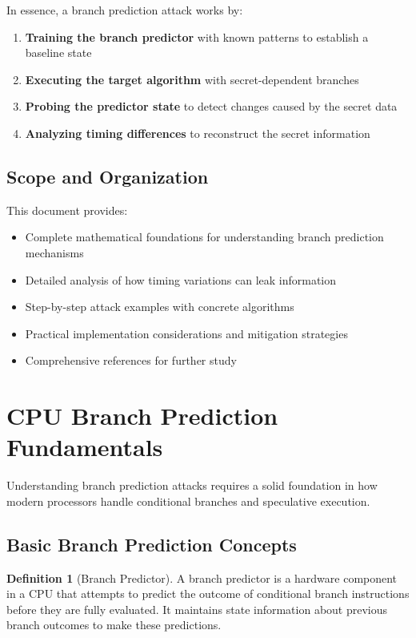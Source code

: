 \documentclass[11pt,a4paper]{article}
\theoremstyle{definition}
\newtheorem{definition}{Definition}[section]
\begin{document}
In essence, a branch prediction attack works by:
\begin{enumerate}[label=\textbf{\arabic*.}]
    \item \textbf{Training the branch predictor} with known patterns to establish a baseline state
    \item \textbf{Executing the target algorithm} with secret-dependent branches
    \item \textbf{Probing the predictor state} to detect changes caused by the secret data
    \item \textbf{Analyzing timing differences} to reconstruct the secret information
\end{enumerate}

\subsection{Scope and Organization}

This document provides:
\begin{itemize}
    \item Complete mathematical foundations for understanding branch prediction mechanisms
    \item Detailed analysis of how timing variations can leak information
    \item Step-by-step attack examples with concrete algorithms
    \item Practical implementation considerations and mitigation strategies
    \item Comprehensive references for further study
\end{itemize}

\section{CPU Branch Prediction Fundamentals}

Understanding branch prediction attacks requires a solid foundation in how modern processors handle conditional branches and speculative execution.

\subsection{Basic Branch Prediction Concepts}

\begin{definition}[Branch Predictor]
A branch predictor is a hardware component in a CPU that attempts to predict the outcome of conditional branch instructions before they are fully evaluated. It maintains state information about previous branch outcomes to make these predictions.
\end{definition}
\end{document}
